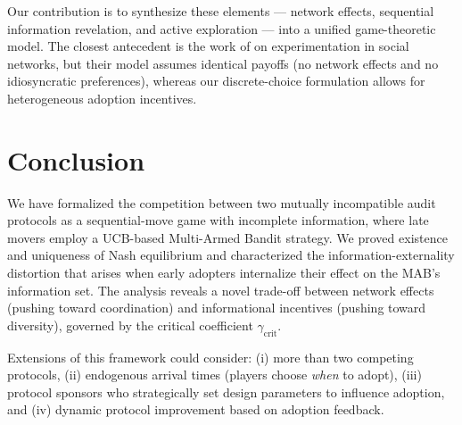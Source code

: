 \documentclass[12pt,a4paper]{article}
\begin{document}
Our contribution is to synthesize these elements — network effects,
sequential information revelation, and active exploration — into a unified
game-theoretic model.  The closest antecedent is the work of
\citet{kremer2014implementing} on experimentation in social networks, but
their model assumes identical payoffs (no network effects and no
idiosyncratic preferences), whereas our discrete-choice formulation allows
for heterogeneous adoption incentives.

\section{Conclusion}

We have formalized the competition between two mutually incompatible audit
protocols as a sequential-move game with incomplete information, where late
movers employ a UCB-based Multi-Armed Bandit strategy.  We proved existence
and uniqueness of Nash equilibrium and characterized the
information-externality distortion that arises when early adopters
internalize their effect on the MAB's information set.  The analysis
reveals a novel trade-off between network effects (pushing toward
coordination) and informational incentives (pushing toward diversity),
governed by the critical coefficient $\gamma_{\text{crit}}$.

\medskip\noindent
Extensions of this framework could consider: (i) more than two competing
protocols, (ii) endogenous arrival times (players choose \emph{when} to
adopt), (iii) protocol sponsors who strategically set design parameters
to influence adoption, and (iv) dynamic protocol improvement based on
adoption feedback.
\end{document}
